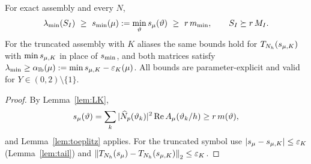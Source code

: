 \begin{theorem}\label{thm:spectral}
For exact assembly and every $N$,
\begin{equation}
 \lambda_{\min}(S_I)\ \ge\ \smin(\mu):=\min_{\vartheta}\sym{s}_\mu(\vartheta)
 \ \ge\ \rf\,m_{\min},
 \qquad S_I\succeq \rf\,M_I .
 \label{eq:spectral}
\end{equation}
For the truncated assembly with $K$ aliases the same bounds hold for
$T_{N_h}(s_{\mu,K})$ with $\min s_{\mu,K}$ in place of $s_{\min}$, and both
matrices satisfy $\lambda_{\min}\ge\alpha_{\rm lb}(\mu):=\min s_{\mu,K}-\varepsilon_K(\mu)$.
All bounds are parameter-explicit and valid for $Y\in(0,2)\setminus\{1\}$.
\end{theorem}
\begin{proof}
By Lemma~\ref{lem:LK},
\[
s_\mu(\vartheta)=\sum_k|\widehat N_p(\vartheta_k)|^2\operatorname{Re} A_\mu(\vartheta_k/h)\ge r\,m(\vartheta),
\]
and Lemma~\ref{lem:toeplitz} applies.  For the truncated symbol use
$|s_\mu-s_{\mu,K}|\le\varepsilon_K$ (Lemma~\ref{lem:tail}) and
$\left\lVert T_{N_h}(s_\mu)-T_{N_h}(s_{\mu,K})\right\rVert_2\le\varepsilon_K$.
\end{proof}
